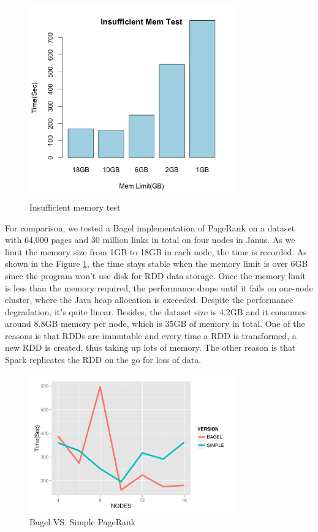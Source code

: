 \documentclass{article}
\begin{document}
\begin{figure}[H]
        \centering
        \includegraphics[width=90mm]{images/insufficient_memory.png}
        \caption{Insufficient memory test}
        \label{fig:insuff-mem}
    \end{figure}

For comparison, we tested a Bagel implementation of PageRank on a dataset with
64,000 pages and 30 million links in total on four nodes in Janus. As we limit
the memory size from 1GB to 18GB in each node, the time is recorded. As shown
in the Figure \ref{fig:insuff-mem}, the time stays stable when the memory limit
is over 6GB since the program won’t use disk for RDD data storage. Once the
memory limit is less than the memory required, the performance drops until it
fails on one-node cluster, where the Java heap allocation is exceeded. Despite
the performance degradation, it's quite linear. Besides, the dataset size is
4.2GB and it consumes around 8.8GB memory per node, which is 35GB of memory in
total. One of the reasons is that RDDs are immutable and every time a RDD is
transformed, a new RDD is created, thus taking up lots of memory. The other
reason is that Spark replicates the RDD on the go for loss of data.

\begin{figure}[H]
        \centering
        \includegraphics[width=90mm]{images/bagelsimple.png}
        \caption{Bagel VS. Simple PageRank}
        \label{fig:bagelsimple}
    \end{figure}
\end{document}
